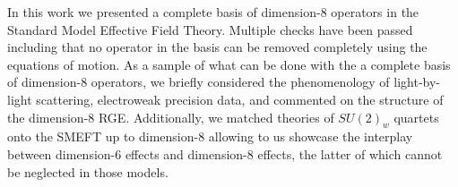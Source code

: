 In this work we presented a complete basis of dimension-8 operators in the Standard Model Effective Field Theory.
Multiple checks have been passed including that no operator in the basis can be removed completely using the equations of motion.
As a sample of what can be done with the a complete basis of dimension-8 operators, we briefly considered the phenomenology of light-by-light scattering, electroweak precision data, and commented on the structure of the dimension-8 RGE.
Additionally, we matched theories of $SU(2)_w$ quartets onto the SMEFT up to dimension-8 allowing to us showcase the interplay between dimension-6 effects and dimension-8 effects, the latter of which cannot be neglected in those models.